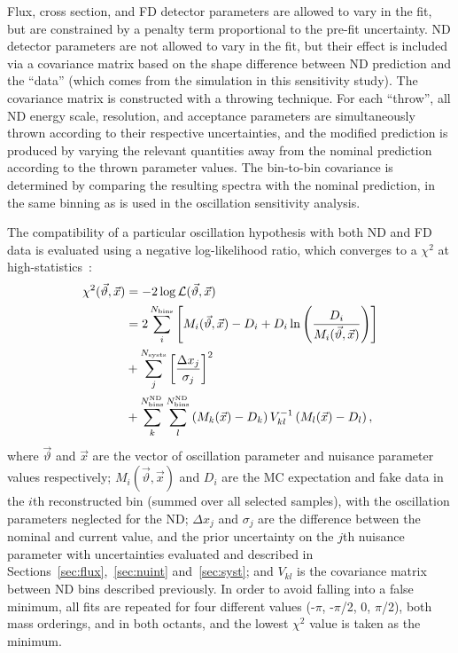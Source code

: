 Flux, cross section, and FD detector parameters are allowed to vary in the fit, but are constrained by a penalty term proportional to the pre-fit uncertainty. ND detector parameters are not allowed to vary in the fit, but their effect is included via a covariance matrix based on the shape difference between ND prediction and the ``data'' (which comes from the simulation in this sensitivity study). The covariance matrix is constructed with a throwing technique. For each ``throw'', all ND energy scale, resolution, and acceptance parameters are simultaneously thrown according to their respective uncertainties, and the modified prediction is produced by varying the relevant quantities away from the nominal prediction according to the thrown parameter values. The bin-to-bin covariance is determined by comparing the resulting spectra with the nominal prediction, in the same binning as is used in the oscillation sensitivity analysis.

The compatibility of a particular oscillation hypothesis with both ND and FD data is evaluated using a negative log-likelihood ratio, which converges to a $\chi^{2}$ at high-statistics~\cite{Tanabashi:2018oca}:
\begin{equation}
\begin{aligned}
  \chi^2(\vec{\vartheta}, \vec{x}) &= -2\log\mathcal{L}(\vec{\vartheta}, \vec{x}) \\
  &= 2\sum_i^{N_{\rm bins}}\left[ M_i(\vec{\vartheta}, \vec{x})-D_i+D_i\ln\left({D_i\over M_i(\vec{\vartheta}, \vec{x})}\right) \right] \\
  &+ \sum_{j}^{N_{\mathrm{systs}}}\left[ \frac{\Delta x_{j}}{\sigma_{j}} \right]^{2} \\
  &+ \sum^{N^{\mathrm{ND}}_{\mathrm{bins}}}_{k}\sum^{N^{\mathrm{ND}}_{\mathrm{bins}}}_{l} \left(M_k(\vec{x})-D_k \right) V^{-1}_{kl}\left(M_l(\vec{x})-D_l \right),
\end{aligned}
\label{eq:chisq}
\end{equation}
where $\vec{\vartheta}$ and $\vec{x}$ are the vector of oscillation parameter and nuisance parameter values respectively; $M_i(\vec{\vartheta}, \vec{x})$ and $D_{i}$ are the MC expectation and fake data in the $i$th reconstructed bin (summed over all selected samples), with the oscillation parameters neglected for the ND; $\Delta x_{j}$ and $\sigma_{j}$ are the difference between the nominal and current value, and the prior uncertainty on the $j$th nuisance parameter with uncertainties evaluated and described in Sections~\ref{sec:flux},~\ref{sec:nuint} and~\ref{sec:syst}; and $V_{kl}$ is the covariance matrix between ND bins described previously. In order to avoid falling into a false minimum, all fits are repeated for four different \deltacp values (-$\pi$, -$\pi$/2, 0, $\pi$/2), both mass orderings, and in both octants, and the lowest $\chi^{2}$ value is taken as the minimum.

